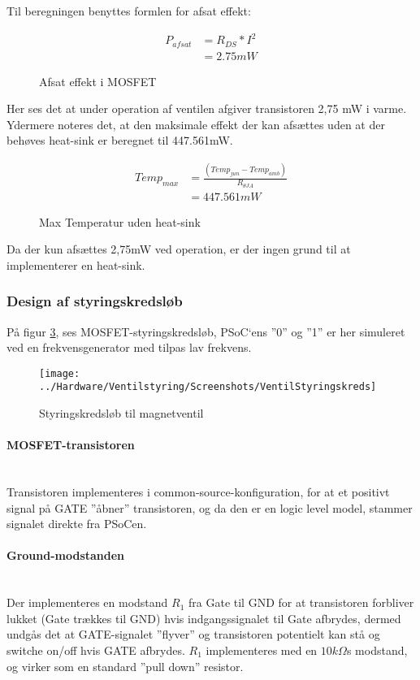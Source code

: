 Til beregningen benyttes formlen for afsat effekt: 

\begin{figure}[!h]
		\begin{align*}
		P_{afsat} &= R_{DS}*I^2 \\ 
		&= 2.75 mW
		\end{align*}
\caption{Afsat effekt i MOSFET}
\label{eq:afsatEffektMOSFET}
\end{figure}

Her ses det at under operation af ventilen afgiver transistoren 2,75 mW i varme. Ydermere noteres det, at den maksimale effekt der kan afsættes uden at der behøves heat-sink er beregnet til 447.561mW. 

\begin{figure}[!h]
	\begin{align*}
		Temp_{max} &= \frac{(Temp_{jun}-Temp_{amb})}{R_{\theta JA}} \\ 
		&= 447.561 mW
	\end{align*}
\caption{Max Temperatur uden heat-sink}
\label{eq:maxMOSFETeffekt}
\end{figure}

Da der kun afsættes 2,75mW ved operation, er der ingen grund til at implementerer en heat-sink.


\subsubsection{Design af styringskredsløb}
På figur \ref{screenshot:ventilStyringskreds}, ses MOSFET-styringskredsløb, PSoC`ens ”0” og ”1” er her simuleret ved en frekvensgenerator med tilpas lav frekvens.

\begin{figure}[!h]
	\centering
	\texttt{[image: ../Hardware/Ventilstyring/Screenshots/VentilStyringskreds]}
	\caption{Styringskredsløb til magnetventil}
	\label{screenshot:ventilStyringskreds}
\end{figure}

\paragraph{MOSFET-transistoren} \hspace{0pt} \\
Transistoren implementeres i common-source-konfiguration, for at et positivt signal på GATE ”åbner” transistoren, og da den er en logic level
model, stammer signalet direkte fra PSoCen. 

\paragraph{Ground-modstanden} \hspace{0pt} \\
Der implementeres en modstand $R_1$ fra Gate til GND for at transistoren forbliver lukket (Gate trækkes til GND) hvis indgangssignalet til Gate afbrydes, dermed undgås det at GATE-signalet ”flyver” og transistoren potentielt kan stå og switche on/off hvis GATE afbrydes. $R_1$ implementeres med en $10k\Omega$s modstand, og virker som en standard ”pull down” resistor.

